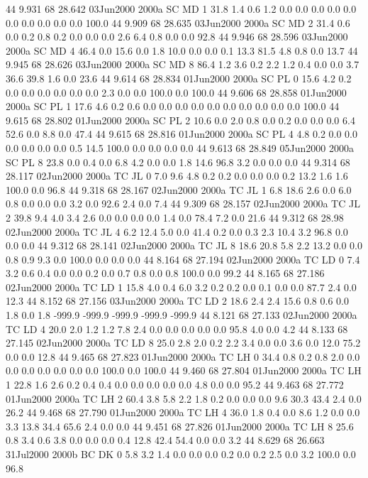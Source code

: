 44 9.931	68 28.642	03Jun2000	2000a	SC	MD	1	31.8	1.4	0.6	1.2	0.0	0.0	0.0	0.0	0.0	0.0	0.0	0.0	0.0	0.0	100.0
44 9.909	68 28.635	03Jun2000	2000a	SC	MD	2	31.4	0.6	0.0	0.2	0.8	0.2	0.0	0.0	0.0	2.6	6.4	0.8	0.0	0.0	92.8
44 9.946	68 28.596	03Jun2000	2000a	SC	MD	4	46.4	0.0	15.6	0.0	1.8	10.0	0.0	0.0	0.1	13.3	81.5	4.8	0.8	0.0	13.7
44 9.945	68 28.626	03Jun2000	2000a	SC	MD	8	86.4	1.2	3.6	0.2	2.2	1.2	0.4	0.0	0.0	3.7	36.6	39.8	1.6	0.0	23.6
44 9.614	68 28.834	01Jun2000	2000a	SC	PL	0	15.6	4.2	0.2	0.0	0.0	0.0	0.0	0.0	0.0	2.3	0.0	0.0	100.0	0.0	100.0
44 9.606	68 28.858	01Jun2000	2000a	SC	PL	1	17.6	4.6	0.2	0.6	0.0	0.0	0.0	0.0	0.0	0.0	0.0	0.0	0.0	0.0	100.0
44 9.615	68 28.802	01Jun2000	2000a	SC	PL	2	10.6	0.0	2.0	0.8	0.0	0.2	0.0	0.0	0.0	6.4	52.6	0.0	8.8	0.0	47.4
44 9.615	68 28.816	01Jun2000	2000a	SC	PL	4	4.8	0.2	0.0	0.0	0.0	0.0	0.0	0.0	0.5	14.5	100.0	0.0	0.0	0.0	0.0
44 9.613	68 28.849	05Jun2000	2000a	SC	PL	8	23.8	0.0	0.4	0.0	6.8	4.2	0.0	0.0	1.8	14.6	96.8	3.2	0.0	0.0	0.0
44 9.314	68 28.117	02Jun2000	2000a	TC	JL	0	7.0	9.6	4.8	0.2	0.2	0.0	0.0	0.0	0.2	13.2	1.6	1.6	100.0	0.0	96.8
44 9.318	68 28.167	02Jun2000	2000a	TC	JL	1	6.8	18.6	2.6	0.0	6.0	0.8	0.0	0.0	0.0	3.2	0.0	92.6	2.4	0.0	7.4
44 9.309	68 28.157	02Jun2000	2000a	TC	JL	2	39.8	9.4	4.0	3.4	2.6	0.0	0.0	0.0	0.0	1.4	0.0	78.4	7.2	0.0	21.6
44 9.312	68 28.98	02Jun2000	2000a	TC	JL	4	6.2	12.4	5.0	0.0	41.4	0.2	0.0	0.3	2.3	10.4	3.2	96.8	0.0	0.0	0.0
44 9.312	68 28.141	02Jun2000	2000a	TC	JL	8	18.6	20.8	5.8	2.2	13.2	0.0	0.0	0.8	0.9	9.3	0.0	100.0	0.0	0.0	0.0
44 8.164	68 27.194	02Jun2000	2000a	TC	LD	0	7.4	3.2	0.6	0.4	0.0	0.0	0.2	0.0	0.7	0.8	0.0	0.8	100.0	0.0	99.2
44 8.165	68 27.186	02Jun2000	2000a	TC	LD	1	15.8	4.0	0.4	6.0	3.2	0.2	0.2	0.0	0.1	0.0	0.0	87.7	2.4	0.0	12.3
44 8.152	68 27.156	03Jun2000	2000a	TC	LD	2	18.6	2.4	2.4	15.6	0.8	0.6	0.0	1.8	0.0	1.8	-999.9	-999.9	-999.9	-999.9	-999.9
44 8.121	68 27.133	02Jun2000	2000a	TC	LD	4	20.0	2.0	1.2	1.2	7.8	2.4	0.0	0.0	0.0	0.0	0.0	95.8	4.0	0.0	4.2
44 8.133	68 27.145	02Jun2000	2000a	TC	LD	8	25.0	2.8	2.0	0.2	2.2	3.4	0.0	0.0	3.6	0.0	12.0	75.2	0.0	0.0	12.8
44 9.465	68 27.823	01Jun2000	2000a	TC	LH	0	34.4	0.8	0.2	0.8	2.0	0.0	0.0	0.0	0.0	0.0	0.0	0.0	100.0	0.0	100.0
44 9.460	68 27.804	01Jun2000	2000a	TC	LH	1	22.8	1.6	2.6	0.2	0.4	0.4	0.0	0.0	0.0	0.0	0.0	4.8	0.0	0.0	95.2
44 9.463	68 27.772	01Jun2000	2000a	TC	LH	2	60.4	3.8	5.8	2.2	1.8	0.2	0.0	0.0	0.0	9.6	30.3	43.4	2.4	0.0	26.2
44 9.468	68 27.790	01Jun2000	2000a	TC	LH	4	36.0	1.8	0.4	0.0	8.6	1.2	0.0	0.0	3.3	13.8	34.4	65.6	2.4	0.0	0.0
44 9.451	68 27.826	01Jun2000	2000a	TC	LH	8	25.6	0.8	3.4	0.6	3.8	0.0	0.0	0.0	0.4	12.8	42.4	54.4	0.0	0.0	3.2
44 8.629	68 26.663	31Jul2000	2000b	BC	DK	0	5.8	3.2	1.4	0.0	0.0	0.0	0.2	0.0	0.2	2.5	0.0	3.2	100.0	0.0	96.8
